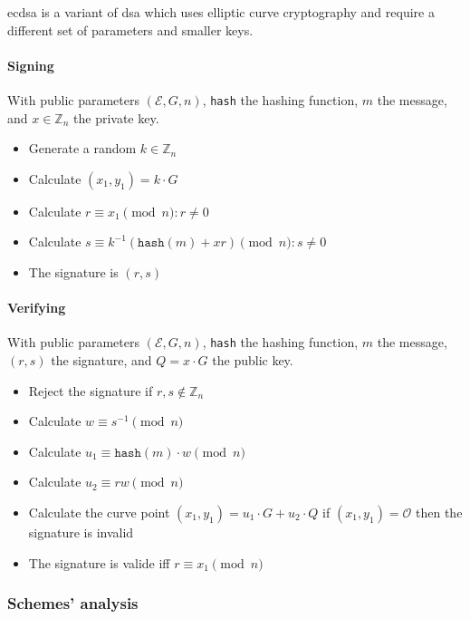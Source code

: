 \gls{ecdsa} is a variant of \gls{dsa} which uses elliptic curve cryptography and
require a different set of parameters and smaller keys.

\paragraph{Signing}

With public parameters $(\mathcal{E}, G, n)$, \texttt{hash} the hashing function,
$m$ the message, and $x \in \mathbb{Z}_n$ the private key.

\begin{itemize}
  \item Generate a random $k \in \mathbb{Z}_n$
  \item Calculate $(x_1, y_1) = k \cdot G$
  \item Calculate $r \equiv x_1 \pmod n : r \neq 0$
  \item Calculate $s \equiv k^{-1}(\texttt{hash}(m) + xr) \pmod n : s \neq 0$
  \item The signature is $(r, s)$
\end{itemize}

\paragraph{Verifying}

With public parameters $(\mathcal{E}, G, n)$, \texttt{hash} the hashing function,
$m$ the message, $(r, s)$ the signature, and $Q = x \cdot G$ the public key.

\begin{itemize}
  \item Reject the signature if $r, s \notin \mathbb{Z}_n$
  \item Calculate $w \equiv s^{-1} \pmod n$
  \item Calculate $u_1 \equiv \texttt{hash}(m) \cdot w \pmod n$
  \item Calculate $u_2 \equiv rw \pmod n$
  \item Calculate the curve point $(x_1, y_1) = u_1 \cdot G + u_2 \cdot Q$ if
  $(x_1, y_1) = \mathcal{O}$ then the signature is invalid
  \item The signature is valide iff $r \equiv x_1 \pmod n$
\end{itemize}

\subsubsection{Schemes' analysis}

